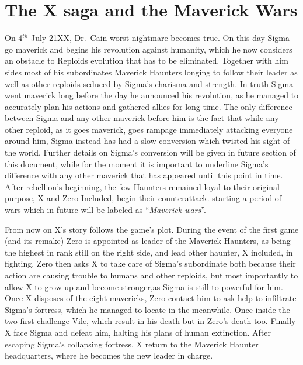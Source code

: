 \section{The X saga and the Maverick Wars}
On 4$^{th}$ July 21XX, Dr.~Cain worst nightmare becomes true. On this day Sigma go maverick and begins his revolution against humanity, which he now considers an obstacle to Reploids evolution that has to be eliminated. Together with him sides most of his subordinates Maverick Haunters longing to follow their leader as well as other reploids seduced by Sigma's charisma and strength. In truth Sigma went maverick long before the day he announced his revolution, as he managed to accurately plan his actions and gathered allies for long time. The only difference between Sigma and any other maverick before him is the fact that while any other reploid, as it goes maverick, goes rampage immediately attacking everyone around him, Sigma instead has had a slow conversion which twisted his sight of the world. Further details on Sigma's conversion will be given in future section of this document, while for the moment it is important to underline Sigma's difference with any other maverick that has appeared until this point in time. After rebellion's beginning, the few Haunters remained loyal to their original purpose, X and Zero Included, begin their counterattack. starting a period of wars which in future will be labeled as ``\emph{Maverick wars}''. 

From now on X's story follows the game's plot. During the event of the first game (and its remake) Zero is appointed as leader of the Maverick Haunters, as being the highest in rank still on the right side, and lead other haunter, X included, in fighting. Zero then asks  X to take care of Sigma's subordinate both because their action are causing trouble to humans and other reploids, but most importantly to allow X to grow up and become stronger,as Sigma is still to powerful for him. Once X disposes of the eight mavericks, Zero contact him to ask help to infiltrate Sigma's fortress, which he managed to locate in the meanwhile. Once inside the two first challenge Vile, which result in his death but in Zero's death too. Finally X face Sigma and defeat him, halting his plans of human extinction. After escaping Sigma's collapsing fortress, X return to the Maverick Haunter headquarters, where he becomes the new leader in charge.
